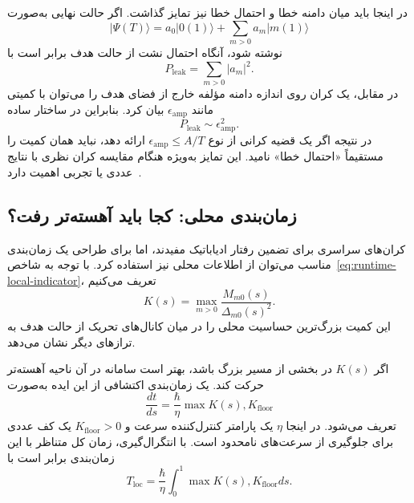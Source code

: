 در اینجا باید میان دامنه خطا و احتمال خطا نیز تمایز گذاشت. اگر
حالت نهایی به‌صورت
\begin{equation}
	|\Psi(T)\rangle=
	a_0|0(1)\rangle
	+
	\sum_{m>0}a_m|m(1)\rangle
\end{equation}
نوشته شود، آنگاه احتمال نشت از حالت هدف برابر است با
\begin{equation}
	P_{\mathrm{leak}}=	
	\sum_{m>0}|a_m|^2.
\end{equation}
در مقابل، یک کران روی اندازه دامنه مؤلفه خارج از فضای هدف را می‌توان
با کمیتی مانند $\epsilon_{\mathrm{amp}}$ بیان کرد. بنابراین در
ساختار ساده
\begin{equation}
	P_{\mathrm{leak}}
	\sim
	\epsilon_{\mathrm{amp}}^2.
	\label{eq:amplitude-probability}
\end{equation}
در نتیجه اگر یک قضیه کرانی از نوع
$\epsilon_{\mathrm{amp}}\leq A/T$ ارائه دهد، نباید همان کمیت را
مستقیماً «احتمال خطا» نامید. این تمایز به‌ویژه هنگام مقایسه کران
نظری با نتایج عددی یا تجربی اهمیت دارد~\cite{GapJansen2007}.

\subsection{زمان‌بندی محلی: کجا باید آهسته‌تر رفت؟}

کران‌های سراسری برای تضمین رفتار ادیاباتیک مفیدند، اما برای طراحی
یک زمان‌بندی مناسب می‌توان از اطلاعات محلی نیز استفاده کرد. با
توجه به شاخص~\eqref{eq:runtime-local-indicator}، تعریف می‌کنیم
\begin{equation}
	K(s)=
	\max_{m>0}
	\frac{M_{m0}(s)}
	{\Delta_{m0}(s)^2}.
	\label{eq:local-sensitivity-K}
\end{equation}
این کمیت بزرگ‌ترین حساسیت محلی را در میان کانال‌های تحریک از حالت
هدف به ترازهای دیگر نشان می‌دهد.

اگر $K(s)$ در بخشی از مسیر بزرگ باشد، بهتر است سامانه در آن ناحیه
آهسته‌تر حرکت کند. یک زمان‌بندی اکتشافی از این ایده به‌صورت
\begin{equation}
	\frac{dt}{ds}=	
	\frac{\hbar}{\eta}
	\max{K(s),K_{\mathrm{floor}}}
	\label{eq:gap-local-schedule}
\end{equation}
تعریف می‌شود. در اینجا $\eta$ یک پارامتر کنترل‌کننده سرعت و
$K_{\mathrm{floor}}>0$ یک کف عددی برای جلوگیری از سرعت‌های نامحدود
است. با انتگرال‌گیری، زمان کل متناظر با این زمان‌بندی برابر است با
\begin{equation}
	T_{\mathrm{loc}}=
	\frac{\hbar}{\eta}
	\int_0^1
	\max{K(s),K_{\mathrm{floor}}} ds.
	\label{eq:local-runtime}
\end{equation}

